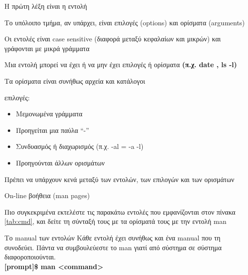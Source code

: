 \begin{center}
\begin{packed_item}

\item Η πρώτη λέξη είναι η εντολή 
\item Το υπόλοιπο τμήμα, αν υπάρχει, είναι επιλογές (options) και ορίσματα (arguments)‏
\item Οι εντολές είναι case sensitive (διαφορά μεταξύ κεφαλαίων και μικρών) και γράφονται με μικρά γράμματα
\item Μια εντολή μπορεί να έχει ή να μην έχει επιλογές ή ορίσματα \textbf{(π.χ. date , ls -l)}
\item Τα ορίσματα είναι συνήθως αρχεία και κατάλογοι
\item επιλογές: 
\begin{itemize}
\item Μεμονωμένα γράμματα 
\item Προηγείται μια παύλα “-”
\item Συνδυασμός ή διαχωρισμός (π.χ. -al   =   -a -l)‏
\item Προηγούνται άλλων ορισμάτων
\end{itemize}	
\item Πρέπει να υπάρχουν κενά μεταξύ των εντολών, των επιλογών και των ορισμάτων
\item On-line βοήθεια (man pages)‏
\end{packed_item}
\end{center}

Πιο συγκεκριμένα εκτελέστε τις παρακάτω εντολές που εμφανίζονται στον πίνακα \ref{tab:cmd}, και δείτε τη σύνταξή τους με τα ορίσματά τους
με την εντολή man\\

\begin{mybox}{Το manual των εντολών}
Κάθε εντολή έχει συνήθως και ένα manual που τη συνοδεύει. Πάντα να συμβουλεύεστε το man γιατί από σύστημα σε σύστημα διαφοροποιούνται. \\

\textbf{[prompt]\$ man <command>}
	
\end{mybox}

